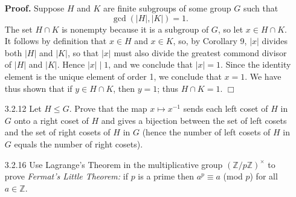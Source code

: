 \documentclass[9pt]{article}
\newcommand{\qed}{\hfill \ensuremath{\Box}}
\newcommand{\Z}{\mathbb{Z}}
\begin{document}
\begin{enumerate}
      \textbf{Proof.} Suppose $H$ and $K$ are finite subgroups of some group $G$
      such that
      $$\gcd(|H|, |K|) = 1.$$
      The set $H \cap K$ is nonempty because it is a subgroup of $G$, so let
      $x \in H \cap K$. It follows by definition that $x \in H$ and $x \in K$,
      so, by Corollary 9, $|x|$ divides both $|H|$ and $|K|$, so that $|x|$ must 
      also divide the greatest commond divisor of $|H|$ and $|K|$. Hence
      $|x| \mid 1$, and we conclude that $|x| = 1$. Since the identity element 
      is the unique element of order 1, we conclude that $x = 1$. We have thus 
      shown that if $y \in H \cap K$, then $y = 1$; thus $H \cap K = 1$. \qed
   \item[3.2.12]  Let $H \le G$. Prove that the map $x \mapsto x^{-1}$ sends
                  each left coset of $H$ in $G$ onto a right coset of $H$ and
                  gives a bijection between the set of left cosets and the set
                  of right cosets of $H$ in $G$ (hence the number of left cosets
                  of $H$ in $G$ equals the number of right cosets).
   \item[3.2.16]  Use Lagrange's Theorem in the multiplicative group
                  $(\Z/p\Z)^\times$ to prove \textit{Fermat's Little Theorem: }
                  if $p$ is a prime then $a^p \equiv a$ (mod $p$) for all
                  $a \in \Z$.


\end{enumerate}
\end{document}
